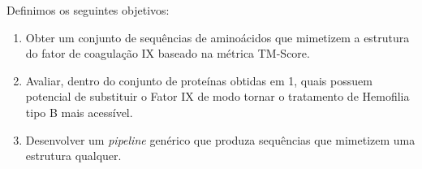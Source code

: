 Definimos os seguintes objetivos:

\begin{enumerate}
  \item Obter um conjunto de sequências de aminoácidos que mimetizem a estrutura do fator de coagulação IX baseado na métrica TM-Score.
  \item Avaliar, dentro do conjunto de proteínas obtidas em 1, quais possuem potencial de substituir o Fator IX de modo tornar o tratamento de Hemofilia tipo B mais acessível.
  \item Desenvolver um \textit{pipeline} genérico que produza sequências que mimetizem uma estrutura qualquer.
\end{enumerate}






 
